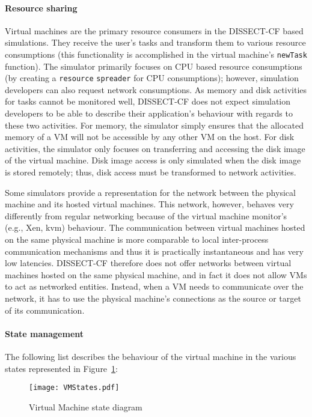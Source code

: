 \documentclass[sort, compress, 5p]{elsarticle}
\begin{document}
\paragraph{Resource sharing} Virtual machines are the primary resource consumers in the DISSECT-CF based simulations. They receive the user's tasks and transform them to various resource consumptions (this functionality is accomplished in the virtual machine's \verb+newTask+ function). The simulator primarily focuses on CPU based resource consumptions (by creating a \verb+resource+ \verb+spreader+ for CPU consumptions); however, simulation developers can also request network consumptions. As memory and disk activities for tasks cannot be monitored well, DISSECT-CF does not expect simulation developers to be able to describe their application's behaviour with regards to these two activities. For memory, the simulator simply ensures that the allocated memory of a VM will not be accessible by any other VM on the host. For disk activities, the simulator only focuses on transferring and accessing the disk image of the virtual machine. Disk image access is only simulated when the disk image is stored remotely; thus, disk access must be transformed to network activities.

Some simulators provide a representation for the network between the physical machine and its hosted virtual machines. This network, however, behaves very differently from regular networking because of the virtual machine monitor's (e.g., Xen, kvm) behaviour. The communication between virtual machines hosted on the same physical machine is more comparable to local inter-process communication mechanisms and thus it is practically instantaneous and has very low latencies. DISSECT-CF therefore does not offer networks between virtual machines hosted on the same physical machine, and in fact it does not allow VMs to act as networked entities. Instead, when a VM needs to communicate over the network, it has to use the physical machine's connections as the source or target of its communication.

\paragraph{State management} The following list describes the behaviour of the virtual machine in the various states represented in Figure~\ref{FIG-VMStates}:
\begin{figure}[tb]
\centering
\texttt{[image: VMStates.pdf]}
\caption{Virtual Machine state diagram\label{FIG-VMStates}}
\end{figure}
\end{document}
